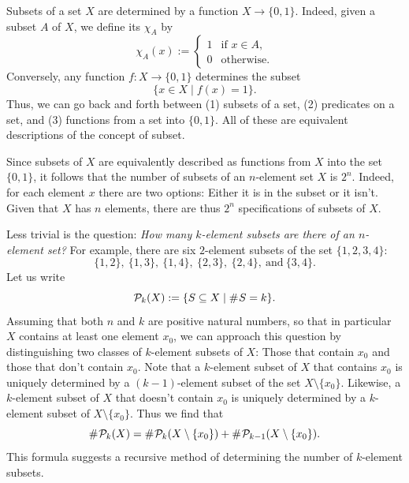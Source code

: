 Subsets of a set $X$ are determined by a function $X\to \{0,1\}$. Indeed, given a subset $A$ of $X$, we define its  $\chi_A$ by
\begin{equation*}
  \chi_A(x):=
  \begin{cases}
    1 & \text{if $x\in A$}, \\
    0 & \text{otherwise}.
  \end{cases}
\end{equation*}
Conversely, any function $f:X\to \{0,1\}$ determines the subset
\begin{equation*}
  \{x\in X\mid f(x)=1\}.
\end{equation*}
Thus, we can go back and forth between (1) subsets of a set, (2) predicates on a set, and (3) functions from a set into $\{0,1\}$. All of these are equivalent descriptions of the concept of subset.

Since subsets of $X$ are equivalently described as functions from $X$ into the set $\{0,1\}$, it follows that the number of subsets of an $n$-element set $X$ is $2^n$. Indeed, for each element $x$ there are two options: Either it is in the subset or it isn't. Given that $X$ has $n$ elements, there are thus $2^n$ specifications of subsets of $X$.

Less trivial is the question: \emph{How many $k$-element subsets are there of an $n$-element set?} For example, there are six $2$-element subsets of the set $\{1,2,3,4\}$:
\begin{equation*}
  \{1,2\},~\{1,3\},~\{1,4\},~\{2,3\},~\{2,4\},~\text{and}~\{3,4\}.
\end{equation*}
Let us write
\begin{equation*}
  \mathcal{P}_k(X):=\{S\subseteq X\mid \mathord{\#}\mkern1mu S=k\}.
\end{equation*}
Assuming that both $n$ and $k$ are positive natural numbers, so that in particular $X$ contains at least one element $x_0$, we can approach this question by distinguishing two classes of $k$-element subsets of $X$: Those that contain $x_0$ and those that don't contain $x_0$. Note that a $k$-element subset of $X$ that contains $x_0$ is uniquely determined by a $(k-1)$-element subset of the set $X\setminus\{x_0\}$. Likewise, a $k$-element subset of $X$ that doesn't contain $x_0$ is uniquely determined by a $k$-element subset of $X\setminus\{x_0\}$. Thus we find that
\begin{equation*}
  \mathord{\#}\mkern1mu \mathcal{P}_k(X) = \mathord{\#}\mkern1mu \mathcal{P}_k(X\setminus\{x_0\})+\mathord{\#}\mkern1mu \mathcal{P}_{k-1}(X\setminus\{x_0\}).
\end{equation*}
This formula suggests a recursive method of determining the number of $k$-element subsets.

